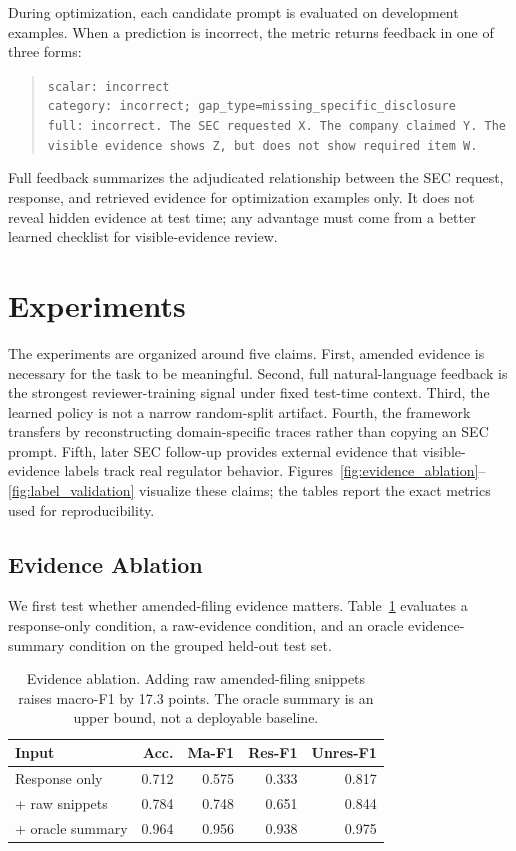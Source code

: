 \documentclass[11pt]{article}
\begin{document}
During optimization, each candidate prompt is evaluated on development examples. When a prediction is incorrect, the metric returns feedback in one of three forms:
\begin{quote}
\small
\texttt{scalar: incorrect}\\
\texttt{category: incorrect; gap\_type=missing\_specific\_disclosure}\\
\texttt{full: incorrect. The SEC requested X. The company claimed Y. The visible evidence shows Z, but does not show required item W.}
\end{quote}
Full feedback summarizes the adjudicated relationship between the SEC request, response, and retrieved evidence for optimization examples only. It does not reveal hidden evidence at test time; any advantage must come from a better learned checklist for visible-evidence review.

\section{Experiments}

The experiments are organized around five claims. First, amended evidence is necessary for the task to be meaningful. Second, full natural-language feedback is the strongest reviewer-training signal under fixed test-time context. Third, the learned policy is not a narrow random-split artifact. Fourth, the framework transfers by reconstructing domain-specific traces rather than copying an SEC prompt. Fifth, later SEC follow-up provides external evidence that visible-evidence labels track real regulator behavior. Figures~\ref{fig:evidence_ablation}--\ref{fig:label_validation} visualize these claims; the tables report the exact metrics used for reproducibility.

\subsection{Evidence Ablation}

We first test whether amended-filing evidence matters. Table~\ref{tab:evidence} evaluates a response-only condition, a raw-evidence condition, and an oracle evidence-summary condition on the grouped held-out test set.

\begin{table}[t]
\centering
\scriptsize
\setlength{\tabcolsep}{3pt}
\begin{tabular}{lrrrr}
\toprule
\textbf{Input} & \textbf{Acc.} & \textbf{Ma-F1} & \textbf{Res-F1} & \textbf{Unres-F1} \\
\midrule
Response only & 0.712 & 0.575 & 0.333 & 0.817 \\
+ raw snippets & 0.784 & 0.748 & 0.651 & 0.844 \\
+ oracle summary & 0.964 & 0.956 & 0.938 & 0.975 \\
\bottomrule
\end{tabular}
\caption{Evidence ablation. Adding raw amended-filing snippets raises macro-F1 by 17.3 points. The oracle summary is an upper bound, not a deployable baseline.}
\label{tab:evidence}
\end{table}
\end{document}
